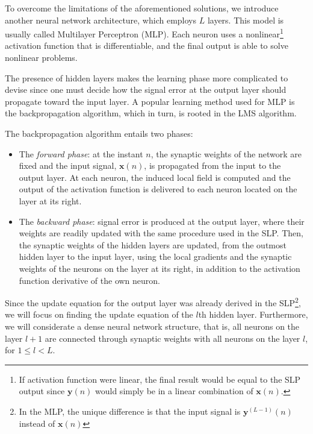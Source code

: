 \documentclass[12pt,a4paper]{article}
\begin{document}
To overcome the limitations of the aforementioned solutions, we introduce another neural network architecture, which employs \(L\) layers. This model is usually called Multilayer Perceptron (MLP). Each neuron uses a nonlinear\footnote{If activation function were linear, the final result would be equal to the SLP output since \(\mathbf{y}(n)\) would simply be in a linear combination of \(\mathbf{x}(n)\).} activation function that is differentiable, and the final output is able to solve nonlinear problems.

The presence of hidden layers makes the learning phase more complicated to devise since one must decide how the signal error at the output layer should propagate toward the input layer. A popular learning method used for MLP is the backpropagation algorithm, which in turn, is rooted in the LMS algorithm.

The backpropagation algorithm entails two phases:
\begin{itemize}
    \item The \emph{forward phase}: at the instant \(n\), the synaptic weights of the network are fixed and the input signal, \(\mathbf{x}(n)\), is propagated from the input to the output layer. At each neuron, the induced local field is computed and the output of the activation function is delivered to each neuron located on the layer at its right.
    \item The \emph{backward phase}: signal error is produced at the output layer, where their weights are readily updated with the same procedure used in the SLP. Then, the synaptic weights of the hidden layers are updated, from the outmost hidden layer to the input layer, using the local gradients and the synaptic weights of the neurons on the layer at its right, in addition to the activation function derivative of the own neuron. 
\end{itemize}

Since the update equation for the output layer was already derived in the SLP\footnote{In the MLP, the unique difference is that the input signal is \(\mathbf{y}^{(L-1)}(n)\) instead of \(\mathbf{x}(n)\)}, we will focus on finding the update equation of the \(l\)th hidden layer. Furthermore, we will considerate a dense neural network structure, that is, all neurons on the layer \(l+1\) are connected through synaptic weights with all neurons on the layer \(l\), for \(1\leq l < L\).
\end{document}
